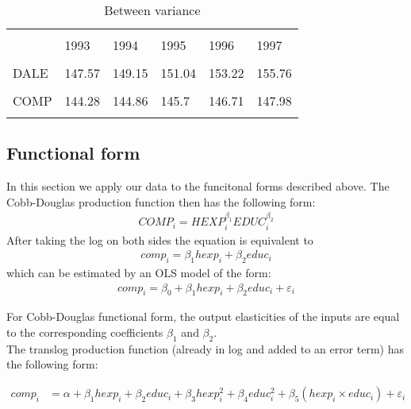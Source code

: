 \documentclass[12pt,a4paper]{article}\usepackage[]{graphicx}\usepackage[]{color}
\begin{document}
\begin{table}[htbp] \centering 
  \caption{Between variance} 
  \label{Between variance of DALE and COMP} 
  \normalsize
\begin{tabular}{p{5cm} p{1.2cm} p{1.2cm} p{1.2cm} p{1.2cm} p{1.2cm}} 
\\[-1.8ex]\hline 
\hline \\[-1.8ex] 
 & 1993 & 1994 & 1995 & 1996 & 1997 \\ 
\hline \\[-1.8ex] 
DALE & 147.57 & 149.15 & 151.04 & 153.22 & 155.76 \\
\hline \\[-1.8ex] 
COMP & 144.28 & 144.86 & 145.7 & 146.71 & 147.98 \\
\hline
\hline \\[-1.8ex] 
\end{tabular} 
\end{table}








\subsection{Functional form}
In this section we apply our data to the funcitonal forms described above. The Cobb-Douglas production function then has the following form:
\begin{gather}
COMP_i = HEXP_i^{\beta_1}EDUC_i^{\beta_2}
\end{gather}
After taking the log on both sides the equation is equivalent to
\begin{gather}
comp_i = \beta_1 hexp_i + \beta_2 educ_i
\end{gather}
which can be estimated by an OLS model of the form:
\begin{gather}
comp_i = \beta_0 + \beta_1 hexp_i + \beta_2 educ_i + \varepsilon_i
\end{gather}

For Cobb-Douglas functional form, the output elasticities of the inputs are equal to the corresponding coefficients $\beta_1$ and $\beta_2$. \\

The translog production function (already in log and added to an error term) has the following form: 

\begin{equation}
\label{eq:translog.nocontrols}
\begin{aligned}
comp_i &= \alpha + \beta_1 hexp_i + \beta_2 educ_i + \beta_3 hexp_i^2 + \beta_4 educ_i^2 + \beta_5 \left(hexp_i \times educ_i\right) + \varepsilon_i
\end{aligned}
\end{equation}
\end{document}
